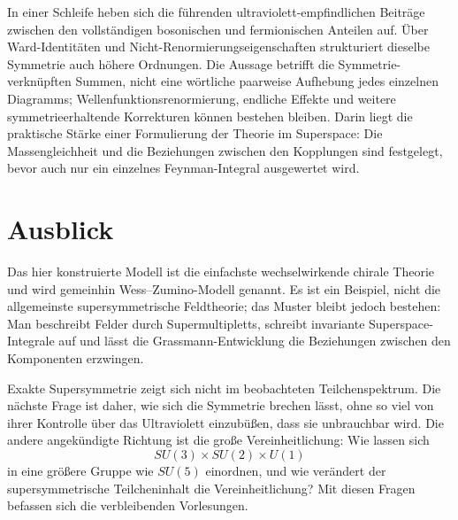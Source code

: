 In einer Schleife heben sich die führenden ultraviolett-empfindlichen Beiträge zwischen den vollständigen bosonischen und fermionischen Anteilen auf. Über Ward-Identitäten und Nicht-Renormierungseigenschaften strukturiert dieselbe Symmetrie auch höhere Ordnungen. Die Aussage betrifft die Symmetrie-verknüpften Summen, nicht eine wörtliche paarweise Aufhebung jedes einzelnen Diagramms; Wellenfunktionsrenormierung, endliche Effekte und weitere symmetrieerhaltende Korrekturen können bestehen bleiben. Darin liegt die praktische Stärke einer Formulierung der Theorie im Superspace: Die Massengleichheit und die Beziehungen zwischen den Kopplungen sind festgelegt, bevor auch nur ein einzelnes Feynman-Integral ausgewertet wird.

\section{Ausblick}

Das hier konstruierte Modell ist die einfachste wechselwirkende chirale Theorie und wird gemeinhin Wess--Zumino-Modell genannt. Es ist ein Beispiel, nicht die allgemeinste supersymmetrische Feldtheorie; das Muster bleibt jedoch bestehen: Man beschreibt Felder durch Supermultipletts, schreibt invariante Superspace-Integrale auf und lässt die Grassmann-Entwicklung die Beziehungen zwischen den Komponenten erzwingen.

Exakte Supersymmetrie zeigt sich nicht im beobachteten Teilchenspektrum. Die nächste Frage ist daher, wie sich die Symmetrie brechen lässt, ohne so viel von ihrer Kontrolle über das Ultraviolett einzubüßen, dass sie unbrauchbar wird. Die andere angekündigte Richtung ist die große Vereinheitlichung: Wie lassen sich
\begin{equation}
SU(3)\times SU(2)\times U(1)
\end{equation}
in eine größere Gruppe wie \(SU(5)\) einordnen, und wie verändert der supersymmetrische Teilcheninhalt die Vereinheitlichung? Mit diesen Fragen befassen sich die verbleibenden Vorlesungen.
